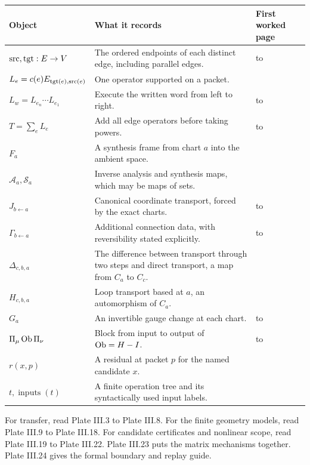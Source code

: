 {\small
\begin{tabularx}{\linewidth}{@{}p{.27\linewidth}Yp{.20\linewidth}@{}}\toprule
\textbf{Object} & \textbf{What it records} & \textbf{First worked page}\\\midrule
$\operatorname{src},\operatorname{tgt}:E\to V$ & The ordered endpoints of each distinct edge, including parallel edges. &  to \\
$L_e=c(e)E_{\operatorname{tgt}(e),\operatorname{src}(e)}$ & One operator supported on a packet. & \\
$L_w=L_{e_n}\cdots L_{e_1}$ & Execute the written word from left to right. &  to \\
$T=\sum_eL_e$ & Add all edge operators before taking powers. &  to \\
$F_a$ & A synthesis frame from chart $a$ into the ambient space. & \\
$\mathcal A_a,\mathcal S_a$ & Inverse analysis and synthesis maps, which may be maps of sets. & \\
$J_{b\leftarrow a}$ & Canonical coordinate transport, forced by the exact charts. &  to \\
$\Gamma_{b\leftarrow a}$ & Additional connection data, with reversibility stated explicitly. &  to \\
$\Delta_{c,b,a}$ & The difference between transport through two steps and direct transport, a map from $C_a$ to $C_c$. & \\
$H_{c,b,a}$ & Loop transport based at $a$, an automorphism of $C_a$. & \\
$G_a$ & An invertible gauge change at each chart. &  to \\
$\Pi_\mu\operatorname{Ob}\Pi_\nu$ & Block from input to output of $\operatorname{Ob}=H-I$. &  to \\
$r(x,p)$ & A residual at packet $p$ for the named candidate $x$. & \\
$t,\operatorname{inputs}(t)$ & A finite operation tree and its syntactically used input labels. & \\\bottomrule
\end{tabularx}}

For transfer, read Plate III.3 to Plate III.8. For the finite geometry models, read Plate III.9 to Plate III.18. For candidate certificates and nonlinear scope, read Plate III.19 to Plate III.22. Plate III.23 puts the matrix mechanisms together. Plate III.24 gives the formal boundary and replay guide.

